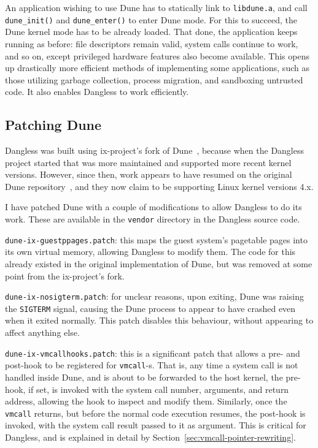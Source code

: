 An application wishing to use Dune has to statically link to \texttt{libdune.a}, and call \lstinline!dune_init()! and \lstinline!dune_enter()! to enter Dune mode. For this to succeed, the Dune kernel mode has to be already loaded. That done, the application keeps running as before: file descriptors remain valid, system calls continue to work, and so on, except privileged hardware features also become available. This opens up drastically more efficient methods of implementing some applications, such as those utilizing garbage collection, process migration, and sandboxing untrusted code. It also enables Dangless to work efficiently.

\subsection{Patching Dune}

Dangless was built using ix-project's fork of Dune~\cite{dune-github-ix}, because when the Dangless project started that was more maintained and supported more recent kernel versions. However, since then, work appears to have resumed on the original Dune repository~\cite{dune-github-original}, and they now claim to be supporting Linux kernel versions 4.x.

I have patched Dune with a couple of modifications to allow Dangless to do its work. These are available in the \texttt{vendor} directory in the Dangless source code.

\texttt{dune-ix-guestppages.patch}: this maps the guest system's pagetable pages into its own virtual memory, allowing Dangless to modify them. The code for this already existed in the original implementation of Dune, but was removed at some point from the ix-project's fork.
 
\texttt{dune-ix-nosigterm.patch}: for unclear reasons, upon exiting, Dune was raising the \lstinline!SIGTERM! signal, causing the Dune process to appear to have crashed even when it exited normally. This patch disables this behaviour, without appearing to affect anything else.

\texttt{dune-ix-vmcallhooks.patch}: this is a significant patch that allows a pre- and post-hook to be registered for \lstinline!vmcall!-s. That is, any time a system call is not handled inside Dune, and is about to be forwarded to the host kernel, the pre-hook, if set, is invoked with the system call number, arguments, and return address, allowing the hook to inspect and modify them. Similarly, once the \lstinline!vmcall! returns, but before the normal code execution resumes, the post-hook is invoked, with the system call result passed to it as argument. This is critical for Dangless, and is explained in detail by Section~\ref{sec:vmcall-pointer-rewriting}.

